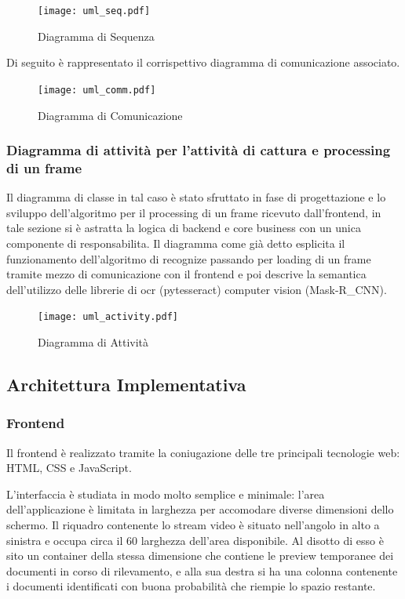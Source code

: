\documentclass[12pt,a4paper]{article}
\newcommand{\mrcnn}{Mask-R\_CNN}
\begin{document}
\begin{figure}[H]
    \caption{Diagramma di Sequenza}
    \centering
    \texttt{[image: uml\_seq.pdf]}
\end{figure}

Di seguito è rappresentato il corrispettivo diagramma di comunicazione
associato.

\begin{figure}[H]
    \caption{Diagramma di Comunicazione}
    \centering
    \texttt{[image: uml\_comm.pdf]}
\end{figure}

\subsubsection{Diagramma di attività per l'attività di cattura e processing di un
frame}

Il diagramma di classe in tal caso è stato sfruttato in fase di
progettazione e lo sviluppo dell'algoritmo per il processing di un
frame ricevuto dall'frontend, in tale sezione si è astratta la logica di
backend e core business con un unica componente di responsabilita.
Il diagramma come già detto esplicita il funzionamento dell'algoritmo di
recognize passando per loading di un frame tramite mezzo di
comunicazione  con il frontend e poi descrive la semantica dell'utilizzo
delle librerie di ocr (pytesseract) computer vision (\mrcnn).

\begin{figure}[p]
    \caption{Diagramma di Attività}
    \centering
    \texttt{[image: uml\_activity.pdf]}
\end{figure}

\pagebreak

\subsection{Architettura Implementativa}

\subsubsection{Frontend}

Il frontend è realizzato tramite la coniugazione delle tre principali
tecnologie web: HTML, CSS e JavaScript.

L'interfaccia è studiata in modo molto semplice e minimale: l'area
dell'applicazione è limitata in larghezza per accomodare diverse
dimensioni dello schermo. Il riquadro contenente lo stream video è
situato nell'angolo in alto a sinistra e occupa circa il 60%
larghezza dell'area disponibile. Al disotto di esso è sito un container
della stessa dimensione che contiene le preview temporanee dei documenti
in corso di rilevamento, e alla sua destra si ha una colonna contenente
i documenti identificati con buona probabilità che riempie lo spazio
restante.
\end{document}

